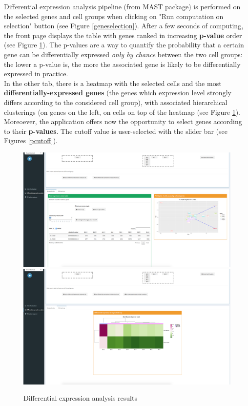 \documentclass{report}
\begin{document}
{Differential expression analysis pipeline (from MAST package\cite{finak2015mast}) is performed on the selected genes and cell groups when clicking on "Run computation on selection" button (see Figure \ref{geneselection}). After a few seconds of computing, the front page displays the table with genes ranked in increasing \textbf{p-value} order (see Figure \ref{de}). The p-values are a way to quantify the probability that a certain gene can be differentially expressed \textit{only by chance} between the two cell groups: the lower a p-value is, the more the associated gene is likely to be differentially expressed in practice.\\

In the other tab, there is a heatmap with the selected cells and the most \textbf{differentially-expressed genes} (the genes which expression level strongly differs according to the considered cell group), with associated hierarchical clusterings (on genes on the left, on cells on top of the heatmap (see Figure \ref{de}).\\

Moreoever, the application offers now the opportunity to select genes according to their \textbf{p-values}. The cutoff value is user-selected with the slider bar (see Figures \ref{pcutoff}).\\

\begin{figure}[H]
\centering
\subfigure\includegraphics[scale=0.2]{application/pvalue-results.png}
\subfigure\includegraphics[scale=0.2]{application/de-results.png}
\caption{Differential expression analysis results}
\label{de}
\end{figure}

}
\end{document}
